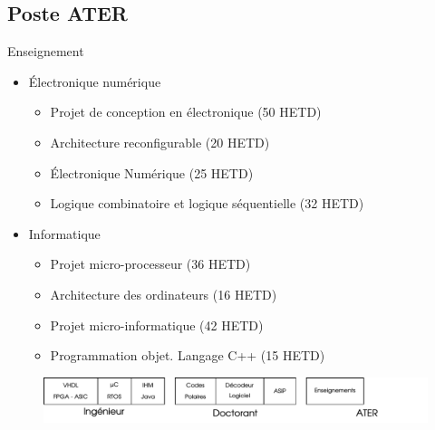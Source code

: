 \documentclass[t,compress,mathserif,12pt,xcolor=dvipsnames]{beamer}
\begin{document}
\subsection{Poste ATER}
\begin{frame}[t]{Enseignement}
  \begin{minipage}[t][5.0cm][t]{\textwidth}
    \vspace{-0.5cm}
    \begin{itemize}
      \item<+-> \'Electronique numérique
      \begin{itemize}
        \item<1-> Projet de conception en \'electronique (50 HETD)
        \item<1-> Architecture reconfigurable (20 HETD)
        \item<1-> \'Electronique Num\'erique (25 HETD)
        \item<1-> Logique combinatoire et logique s\'equentielle (32 HETD)
      \end{itemize}
      \vspace{0.3cm}
      \item<+-> Informatique
      \begin{itemize}
        \item<2-> Projet micro-processeur (36 HETD)
        \item<2-> Architecture des ordinateurs (16 HETD)
        \item<2-> Projet micro-informatique (42 HETD)
        \item<2-> Programmation objet. Langage C++ (15 HETD)
      \end{itemize}
    \end{itemize}

  \end{minipage}
  \begin{figure}[htp]
    \centering
    \includegraphics[width=\textwidth]{fig/frise8}
  \end{figure}
\end{frame} 
\end{document}
